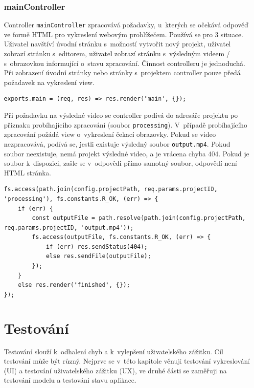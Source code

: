 \subsection{mainController}
Controller \texttt{mainController} zpracovává požadavky, u~kterých se očekává odpověď ve formě HTML pro vykreslení webovým prohlížečem. Používá se pro 3 situace. Uživatel navštíví úvodní stránku s~možností vytvořit nový projekt, uživatel zobrazí stránku s~editorem, uživatel zobrazí stránku s~výsledným videem / s~obrazovkou informující o~stavu zpracování. Činnost controlleru je jednoduchá. Při zobrazení úvodní stránky nebo stránky s~projektem controller pouze předá požadavek na vykreslení view.
\begin{lstlisting}[style=JavaScript]
exports.main = (req, res) => res.render('main', {});
\end{lstlisting}

Při požadavku na výsledné video se controller podívá do adresáře projektu po příznaku probíhajícího zpracování (soubor \texttt{processing}). V~případě probíhajícího zpracování požádá view o~vykreslení čekací obrazovky. Pokud se video nezpracovává, podívá se, jestli existuje výsledný soubor \texttt{output.mp4}. Pokud soubor neexistuje, nemá projekt výsledné video, a je vrácena chyba 404. Pokud je soubor k~dispozici, zašle se v~odpovědi přímo samotný soubor, odpovědí není HTML stránka.
\begin{lstlisting}[style=JavaScript]
fs.access(path.join(config.projectPath, req.params.projectID, 'processing'), fs.constants.R_OK, (err) => {
    if (err) {
        const outputFile = path.resolve(path.join(config.projectPath, req.params.projectID, 'output.mp4'));
        fs.access(outputFile, fs.constants.R_OK, (err) => {
            if (err) res.sendStatus(404);
            else res.sendFile(outputFile);
        });
    }
    else res.render('finished', {});
});
\end{lstlisting}

\chapter{Testování}
Testování slouží k~odhalení chyb a k~vylepšení uživatelského zážitku. Cíl testování může být různý. Nejprve se v~této kapitole věnuji testování vykreslování (UI) a testování uživatelského zážitku (UX), ve druhé části se zaměřuji na testování modelu a testování stavu aplikace.

